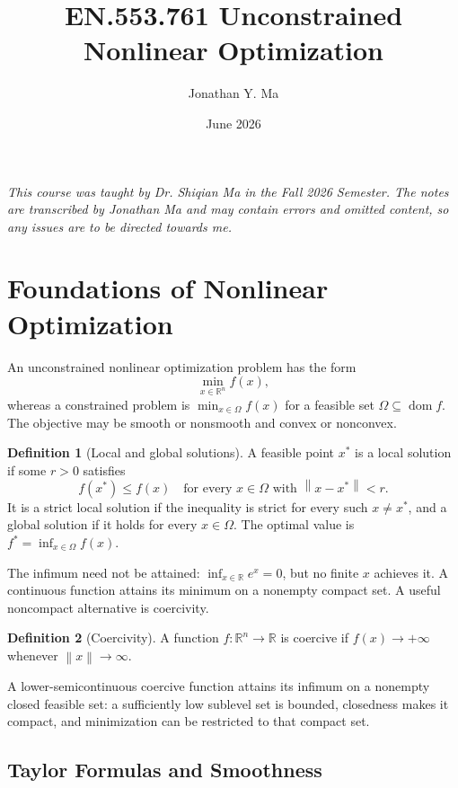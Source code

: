 \documentclass[12pt,oneside]{book}
\title{EN.553.761 Unconstrained Nonlinear Optimization}
\author{Jonathan Y. Ma}
\date{June 2026}
\numberwithin{equation}{section}
\theoremstyle{definition}
\newtheorem{definition}{Definition}[section]
\theoremstyle{plain}
\theoremstyle{remark}
\newcommand{\R}{\mathbb{R}}
\newcommand{\norm}[1]{\left\lVert #1 \right\rVert}
\begin{document}
\maketitle

\noindent \emph{This course was taught by Dr. Shiqian Ma in the Fall 2026 Semester. The notes are transcribed by Jonathan Ma and may contain errors and omitted content, so any issues are to be directed towards me.}

\tableofcontents

\section{Foundations of Nonlinear Optimization}

An unconstrained nonlinear optimization problem has the form
\[
 \min_{x\in\R^n}f(x),
\]
whereas a constrained problem is $\min_{x\in\Omega}f(x)$ for a feasible set
$\Omega\subseteq\operatorname{dom}f$. The objective may be smooth or
nonsmooth and convex or nonconvex.

\begin{definition}[Local and global solutions]
A feasible point $x^*$ is a local solution if some $r>0$ satisfies
\[
 f(x^*)\leq f(x)
 \quad\text{for every }x\in\Omega\text{ with }\norm{x-x^*}<r.
\]
It is a strict local solution if the inequality is strict for every such
$x\neq x^*$, and a global solution if it holds for every $x\in\Omega$.
The optimal value is $f^*=\inf_{x\in\Omega}f(x)$.
\end{definition}

The infimum need not be attained: $\inf_{x\in\R}e^x=0$, but no finite $x$
achieves it. A continuous function attains its minimum on a nonempty compact
set. A useful noncompact alternative is coercivity.

\begin{definition}[Coercivity]
A function $f:\R^n\to\R$ is coercive if
$f(x)\to+\infty$ whenever $\norm{x}\to\infty$.
\end{definition}

A lower-semicontinuous coercive function attains its infimum on a nonempty
closed feasible set: a sufficiently low sublevel set is bounded, closedness
makes it compact, and minimization can be restricted to that compact set.

\subsection{Taylor Formulas and Smoothness}
\end{document}
